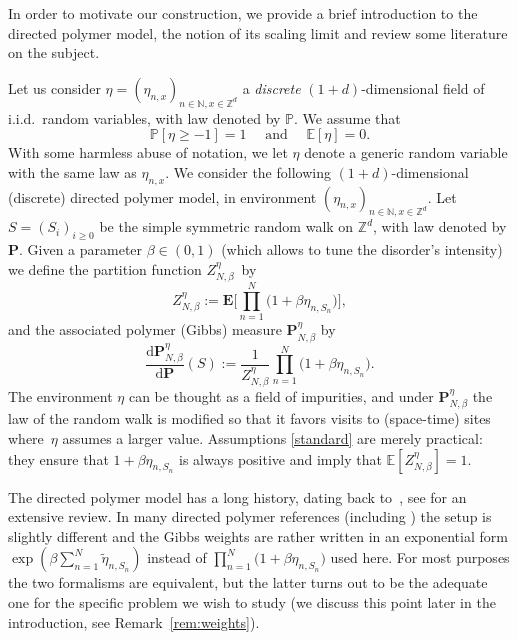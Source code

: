\documentclass[JEP,XML,SOM,Unicode,published]{cedram}
\theoremstyle{definition}
\newcommand{\dd}{\mathrm{d}}
\newcommand{\bP}{{\ensuremath{\mathbf P}} }
\newcommand{\bE}{{\ensuremath{\mathbf E}} }
\newcommand{\bbE}{{\ensuremath{\mathbb E}} }
\newcommand{\bbN}{{\ensuremath{\mathbb N}} }
\newcommand{\bbP}{{\ensuremath{\mathbb P}} }
\newcommand{\bbZ}{{\ensuremath{\mathbb Z}} }
\begin{document}
In order to motivate our construction, we provide a brief introduction to the directed polymer model, the notion of its scaling limit and review some literature on the subject.

\label{sec:discrete}

Let us consider $\eta=(\eta_{n,x})_{n\in \bbN, x\in \bbZ^d}$ a \emph{discrete} $(1+d)$-dimensional field of i.i.d.\ random variables, with law denoted by $\bbP$.
We assume that
\begin{equation} \label{standard}
\bbP[\eta \ge -1]=1 \quad \text{ and } \quad \bbE[\eta]=0.
\end{equation}
With some harmless abuse of notation, we let $\eta$ denote a generic random variable with the same law as $\eta_{n,x}$.
We consider the following $(1+d)$-dimensional (discrete) directed polymer model, in environment $(\eta_{n,x})_{n\in \bbN, x\in \bbZ^d}$.
Let $S=(S_i)_{i\geq 0}$ be the simple symmetric random walk on $\bbZ^d$, with law denoted by $\bP$.
Given a parameter $\beta\in (0,1)$ (which allows to tune the disorder's intensity) we define the partition function $Z^{\eta}_{N,\beta}$~by\vspace*{-3pt}\enlargethispage{.3\baselineskip}%
%
\begin{equation}
\label{def:Zn}
Z^{\eta}_{N,\beta}:= \bE\biggl[\prod_{n=1}^N \bigl(1+\beta \eta_{n,S_n} \bigr) \biggr],
\end{equation}
and the associated polymer (Gibbs) measure $\bP^{\eta}_{N,\beta}$ by\vspace*{-3pt}
\begin{equation}\label{polymers}
\frac{ \dd \bP^{\eta}_{N,\beta}}{\dd \bP}(S):=\frac{1}{Z^{\eta}_{N,\beta}} \prod_{n=1}^N \bigl(1+\beta \eta_{n,S_n} \bigr).
\end{equation}
The environment $\eta$ can be thought as a field of impurities, and under
$\bP^{\eta}_{N,\beta}$ the law of the random walk is modified so that it favors visits to (space-time) sites where~$\eta$ assumes a larger value. Assumptions \eqref{standard} are merely practical:
they ensure that $1+\beta \eta_{n,S_n}$ is always positive and imply that $\bbE [ Z^{\eta}_{N,\beta}]=1$.

The directed polymer model has a long history, dating back to~\cite{HH85}, see \cite{C17} for an extensive review. In many directed polymer references (including \cite{C17}) the setup is slightly different and the Gibbs weights are rather written in an exponential form $\exp(\beta \sum_{n=1}^{N} \tilde\eta_{n,S_n})$ instead of $\prod_{n=1}^N \bigl(1+\beta \eta_{n,S_n} \bigr)$ used here.
For most purposes the two formalisms are equivalent, but the latter turns out to be the adequate one for the specific problem we wish to study (we discuss this point later in the introduction, see Remark~\ref{rem:weights}).
\end{document}
